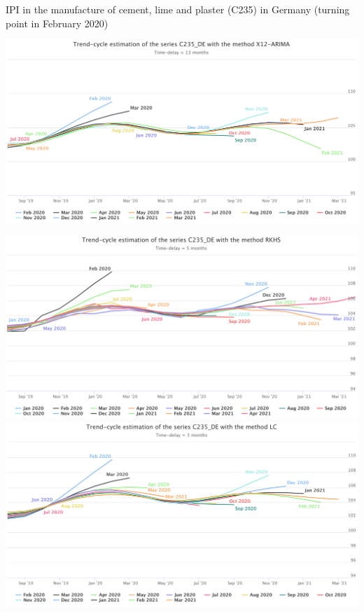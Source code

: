 \documentclass[10pt,xcolor=table,color={dvipsnames,usenames},ignorenonframetext,usepdftitle=false,english]{beamer}
\newcommand\1{\mathds{1}}
\begin{document}
\begin{frame}{IPI in the manufacture of cement, lime and plaster (C235)
in Germany (turning point in February 2020)}
\protect\hypertarget{ipi-in-the-manufacture-of-cement-lime-and-plaster-c235-in-germany-turning-point-in-february-2020}{}
\centering

\includegraphics[height = 0.5\paperheight]{img/C235DE_x13}
\end{frame}

\begin{frame}{}
\protect\hypertarget{section-3}{}
\centering

\includegraphics[height = 0.5\paperheight]{img/C235DE_rkhs}
\includegraphics[height = 0.5\paperheight]{img/C235DE_lc}
\end{frame}
\end{document}
